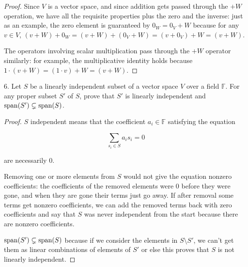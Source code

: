 \documentclass[12pt]{article} %
\newcommand{\F}{\mathbb{F}}
\newcommand{\s}{{\rm span}}
\begin{document}
\begin{flushleft}
\begin{proof}
    Since $V$ is a vector space, and since addition gets passed through the $+W$ operation, we have all the requisite properties plus the zero and the inverse: just as an example, the zero element is guaranteed by $0_W = 0_V + W$ because for any $v\in V$, $(v+W) + 0_W = (v+W) + (0_V + W) = (v+0_V) + W = (v+W)$.

    The operators involving scalar multiplication pass through the $+W$ operator similarly: for example, the multiplicative identity holds because $1\cdot(v+W) = (1\cdot v) + W = (v+W)$.
\end{proof}

\vspace{1cm}

\pagebreak

6.  Let $S$ be a linearly independent subset of a vector space $V$ over a field $\F$. For any proper subset $S'$ of $S$, prove that $S'$ is linearly independent and $\s(S') \subsetneq \s(S)$.   

\begin{proof}
    
$S$ independent means that the coefficient $a_i\in \F$ satisfying the equation

$$\sum_{s_i\in S} a_i s_i = 0$$

are necessarily $0$.

Removing one or more elements from $S$ would not give the equation nonzero coefficients: the coefficients of the removed elements were $0$ before they were gone, and when they are gone their terms just go away. If after removal some terms get nonzero coefficients, we can add the removed terms back with zero coefficients and say that $S$ was never independent from the start because there are nonzero coefficients.

$\s(S') \subsetneq \s(S)$ because if we consider the elements in $S\setminus S'$, we can't get them as linear combinations of elements of $S'$ or else this proves that $S$ is not linearly independent.


\end{proof}


\end{flushleft}
\end{document}
